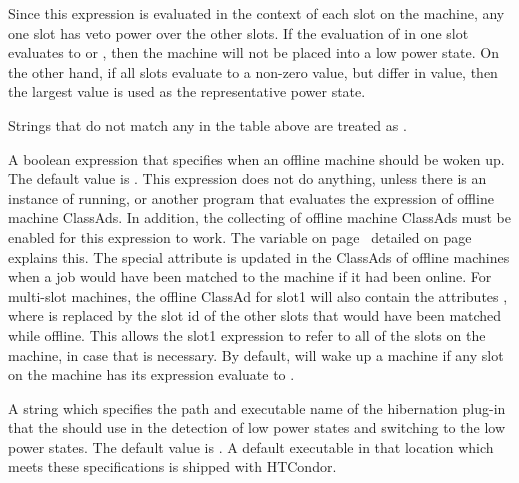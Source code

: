 \begin{description}
  Since this expression is evaluated in the context of each slot on the
  machine, any one slot has veto power over the other slots.  If the 
  evaluation of  in one slot evaluates to 
  or , then the machine will not be placed into a low power
  state.  On the other 
  hand, if all slots evaluate to a non-zero value, but differ in value, 
  then the largest value is used as the representative power state.

  Strings that do not match any in the table above are treated as
  .

\label{param:Unhibernate}
\item[\Macro{UNHIBERNATE}]
  A boolean expression that specifies when an offline machine should be
  woken up.
  The default value is .
  This expression does not do anything,
  unless there is an instance of  running,
  or another program that evaluates the
   expression of offline machine ClassAds.
  In addition, the collecting of offline machine ClassAds must be enabled
  for this expression to work.  The variable 
   on page~\pageref{param:CollectorPersistentAdLog}
  detailed on page~\pageref{param:OfflineLog} explains this.
  The special attribute
   is updated in the ClassAds of offline machines
  when a job would have been matched to the machine if it had been online.
  For multi-slot machines, the offline ClassAd for slot1 will also contain
  the attributes ,
  where  is replaced by the
  slot id of the other slots that would have been matched while offline.
  This allows the slot1  expression to refer to
  all of the slots on the machine, in case that is necessary.
  By default,
   will wake up a machine if any slot on the machine has
  its  expression evaluate to .

\label{param:HibernationPlugin}
\item[\Macro{HIBERNATION\_PLUGIN}]
  A string which specifies the path and executable name of 
  the hibernation plug-in that the  should use 
  in the detection of low power states and switching to the low power states.
  The default value is .  
  A default executable in that location which meets these specifications is
  shipped with HTCondor. 


\end{description}
